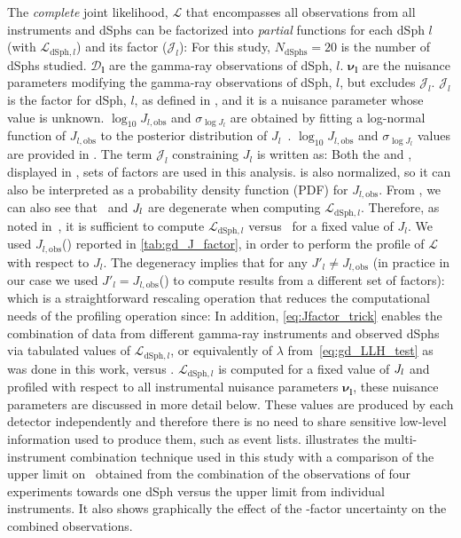 The \textit{complete} joint likelihood, $\mathcal{L}$ that encompasses all observations from all instruments and dSphs can be factorized into \textit{partial} functions for each dSph $l$ (with $\mathcal{L}_{\mathrm{dSph}, l}$) and its \J factor ($\mathcal{J}_l$):
\CompleteGDLLH
For this study, $N_{\mathrm{dSphs}}=20$ is the number of dSphs studied.
$\bm{\mathcal{D}_{l}}$ are the gamma-ray observations of dSph, $l$.
$\bm{\nu_l}$ are the nuisance parameters modifying the gamma-ray observations of dSph, $l$, but excludes $\mathcal{J}_l$.
$\mathcal{J}_l$ is the \J factor for dSph, $l$, as defined in , and it is a nuisance parameter whose value is unknown.
$\log_{10} J_{l,\mathrm{obs}}$ and $\sigma_{\log{J_l}}$ are obtained by fitting a log-normal function of $J_{l,\mathrm{obs}}$ to the posterior distribution of $J_{l}$~\cite{2015PhRvL.115w1301A}.
$\log_{10} J_{l,\mathrm{obs}}$ and $\sigma_{\log{J_l}}$ values are provided in .
The term $\mathcal{J}_l$ constraining $J_l$ is written as:
\JLgdLLH
Both the \GS and \B, displayed in , sets of \J factors are used in this analysis.
 is also normalized, so it can also be interpreted as a probability density function (PDF) for $J_{l,\mathrm{obs}}$.
From , we can also see that \sv~and $J_l$ are degenerate when computing $\mathcal{L}_{\mathrm{dSph},l}$.
Therefore, as noted in~\cite{MAGICFermi_combo}, it is sufficient to compute $\mathcal{L}_{\mathrm{dSph},l}$ versus \sv~for a fixed value of $J_{l}$.
We used $J_{l,\mathrm{obs}}$(\GS) reported in \cref{tab:gd_J_factor}, in order to perform the profile of $\mathcal{L}$ with respect to $J_l$.
The degeneracy implies that for any $J'_l \neq J_{l,\mathrm{obs}}$ (in practice in our case we used $J'_l = J_{l,\mathrm{obs}}$(\B) to compute results from a different set of \J factors):
\jfacTrick
which is a straightforward rescaling operation that reduces the computational needs of the profiling operation since:
\rescaleTrick
In addition, \cref{eq:Jfactor_trick} enables the combination of data from different gamma-ray instruments and observed dSphs via tabulated values of $\mathcal{L}_{\mathrm{dSph},l}$, or equivalently of $\lambda$ from~\cref{eq:gd_LLH_test} as was done in this work, versus \sv.
$\mathcal{L}_{\mathrm{dSph},l}$ is computed for a fixed value of $J_l$ and profiled with respect to all instrumental nuisance parameters $\bm{\nu_l}$, these nuisance parameters are discussed in more detail below.
These values are produced by each detector independently and therefore there is no need to share sensitive low-level information used to produce them, such as event lists.
 illustrates the multi-instrument combination technique used in this study with a comparison of the upper limit on \sv~obtained from the combination of the observations of four experiments towards one dSph versus the upper limit from individual instruments.
It also shows graphically the effect of the \J-factor uncertainty on the combined observations.

